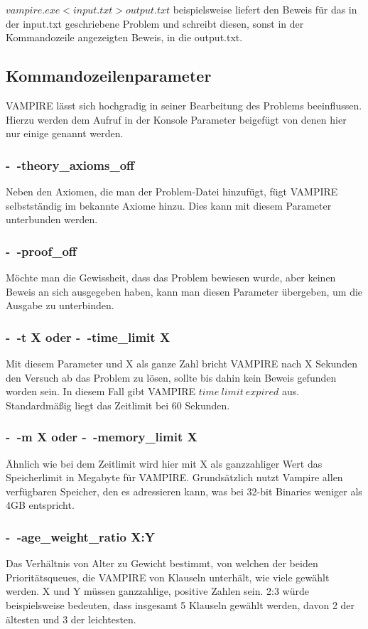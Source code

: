 \documentclass{acm_proc_article-sp-german}
\begin{document}
$ vampire.exe < input.txt > output.txt $ beispielsweise liefert den Beweis für das in der input.txt geschriebene Problem und schreibt diesen, sonst in der Kommandozeile angezeigten Beweis, in die output.txt.

\subsection{Kommandozeilenparameter}
\label{subsec:commands}
VAMPIRE lässt sich hochgradig in seiner Bearbeitung des Problems beeinflussen. Hierzu werden dem Aufruf in der Konsole Parameter beigefügt von denen hier nur einige genannt werden.

\subsubsection{-~-theory\_axioms\_off}
\label{subsubsec: commandtheoryaxiomsoff}
Neben den Axiomen, die man der Problem-Datei hinzufügt, fügt VAMPIRE selbstständig im bekannte Axiome hinzu. Dies kann mit diesem Parameter unterbunden werden.
\subsubsection{-~-proof\_off}
\label{subsubsec: commandproofoff}
Möchte man die Gewissheit, dass das Problem bewiesen wurde, aber keinen Beweis an sich ausgegeben haben, kann man diesen Parameter übergeben, um die Ausgabe zu unterbinden.
\subsubsection{-~-t X oder -~-time\_limit X}
\label{subsubsec: commandtimelimit}
Mit diesem Parameter und X als ganze Zahl bricht VAMPIRE nach X Sekunden den Versuch ab das Problem zu lösen, sollte bis dahin kein Beweis gefunden worden sein.
In diesem Fall gibt VAMPIRE $time~limit~expired$ aus. Standardmäßig liegt das Zeitlimit bei 60  Sekunden.
\subsubsection{-~-m X oder -~-memory\_limit X}
\label{subsubsec: commandmemorylimit}
Ähnlich wie bei dem Zeitlimit wird hier mit X als ganzzahliger Wert das Speicherlimit in Megabyte für VAMPIRE. Grundsätzlich nutzt Vampire allen verfügbaren Speicher, den es adressieren kann, was bei 32-bit Binaries weniger als 4GB entspricht.
\subsubsection{-~-age\_weight\_ratio X:Y}
\label{subsubsec: commandageweightratio}
Das Verhältnis von Alter zu Gewicht bestimmt, von welchen der beiden Prioritätsqueues, die VAMPIRE von Klauseln unterhält, wie viele gewählt werden. X und Y müssen ganzzahlige, positive Zahlen sein.
2:3 würde beispielsweise bedeuten, dass insgesamt 5 Klauseln gewählt werden, davon 2 der ältesten und 3 der leichtesten. 
\end{document}
